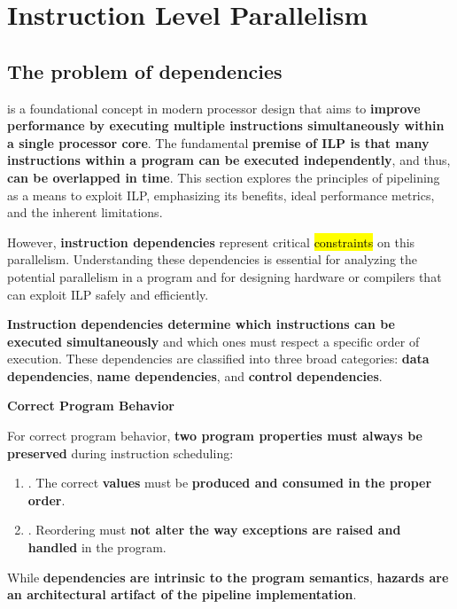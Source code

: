 \section{Instruction Level Parallelism}

\subsection{The problem of dependencies}\label{subsection: The problem of dependencies}

 is a foundational concept in modern processor design that aims to \textbf{improve performance by executing multiple instructions simultaneously within a single processor core}. The fundamental \textbf{premise of ILP is that many instructions within a program can be executed independently}, and thus, \textbf{can be overlapped in time}. This section explores the principles of pipelining as a means to exploit ILP, emphasizing its benefits, ideal performance metrics, and the inherent limitations.

\highspace
However, \textbf{instruction dependencies} represent critical \hl{constraints} on this parallelism. Understanding these dependencies is essential for analyzing the potential parallelism in a program and for designing hardware or compilers that can exploit ILP safely and efficiently.

\highspace
\textbf{Instruction dependencies determine which instructions can be executed simultaneously} and which ones must respect a specific order of execution. These dependencies are classified into three broad categories: \textbf{data dependencies}, \textbf{name dependencies}, and \textbf{control dependencies}.

\highspace
\begin{flushleft}
    \textcolor{Green3}{ \textbf{Correct Program Behavior}}
\end{flushleft}
For correct program behavior, \textbf{two program properties must always be preserved} during instruction scheduling:
\begin{enumerate}
    \item {}. The correct \textbf{values} must be \textbf{produced and consumed in the proper order}.
    \item {}. Reordering must \textbf{not alter the way exceptions are raised and handled} in the program.
\end{enumerate}
While \textbf{dependencies are intrinsic to the program semantics}, \textbf{hazards are an architectural artifact of the pipeline implementation}.